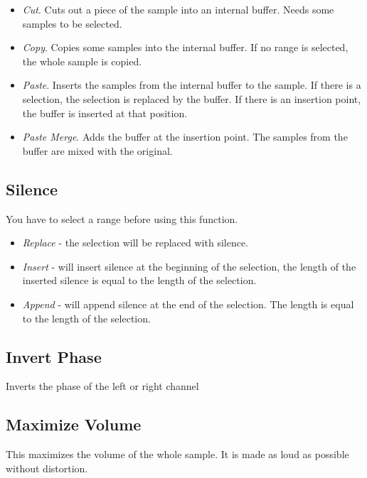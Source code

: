 \documentclass[letterpaper]{report}
\begin{document}
\begin{itemize}

\item {\em Cut}. Cuts out a piece of the sample into an internal buffer. Needs
some samples to be selected.

\item {\em Copy}. Copies some samples into the internal buffer. If no range is
selected, the whole sample is copied.

\item {\em Paste}. Inserts the samples from the internal buffer to the sample.
If there is a selection, the selection is replaced by the buffer. If there
is an insertion point, the buffer is inserted at that position.

\item {\em Paste Merge}. Adds the buffer at the insertion point. The samples
from the buffer are mixed with the original.

\end{itemize}



\subsection{Silence}

You have to select a range before using this function.
\begin{itemize}
\item {\em Replace} - the selection will be replaced with silence.
\item {\em Insert} - will insert silence at the beginning of the selection,
the length of the inserted silence is equal to the length of the selection.
\item {\em Append} - will append silence at the end of the selection. The
length is equal to the length of the selection.
\end{itemize}


\subsection{Invert Phase}
Inverts the phase of the left or right channel


\subsection{Maximize Volume}
This maximizes the volume of the whole sample. It is made as loud as possible
without distortion.
\end{document}
